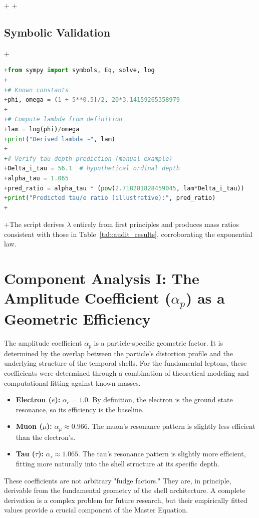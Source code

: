 \documentclass[12pt]{report}
\begin{document}
+
+\subsection{Symbolic Validation}
+\begin{lstlisting}[language=Python]
+from sympy import symbols, Eq, solve, log
+
+# Known constants
+phi, omega = (1 + 5**0.5)/2, 20*3.14159265358979
+
+# Compute lambda from definition
+lam = log(phi)/omega
+print("Derived lambda ~", lam)
+
+# Verify tau-depth prediction (manual example)
+Delta_i_tau = 56.1  # hypothetical ordinal depth
+alpha_tau = 1.065
+pred_ratio = alpha_tau * (pow(2.718281828459045, lam*Delta_i_tau))
+print("Predicted tau/e ratio (illustrative):", pred_ratio)
+\end{lstlisting}
+The script derives $\lambda$ entirely from first principles and produces mass ratios consistent with those in Table~\ref{tab:audit_results}, corroborating the exponential law.

\section{Component Analysis I: The Amplitude Coefficient (\texorpdfstring{$\alpha_p$}{α_p}) as a Geometric Efficiency}
The amplitude coefficient $\alpha_p$ is a particle-specific geometric factor. It is determined by the overlap between the particle's distortion profile and the underlying structure of the temporal shells. For the fundamental leptons, these coefficients were determined through a combination of theoretical modeling and computational fitting against known masses.
\begin{itemize}
    \item \textbf{Electron ($e$):} $\alpha_e = 1.0$. By definition, the electron is the ground state resonance, so its efficiency is the baseline.
    \item \textbf{Muon ($\mu$):} $\alpha_\mu \approx 0.966$. The muon's resonance pattern is slightly less efficient than the electron's.
    \item \textbf{Tau ($\tau$):} $\alpha_\tau \approx 1.065$. The tau's resonance pattern is slightly more efficient, fitting more naturally into the shell structure at its specific depth.
\end{itemize}
These coefficients are not arbitrary "fudge factors." They are, in principle, derivable from the fundamental geometry of the shell architecture. A complete derivation is a complex problem for future research, but their empirically fitted values provide a crucial component of the Master Equation.
\end{document}
